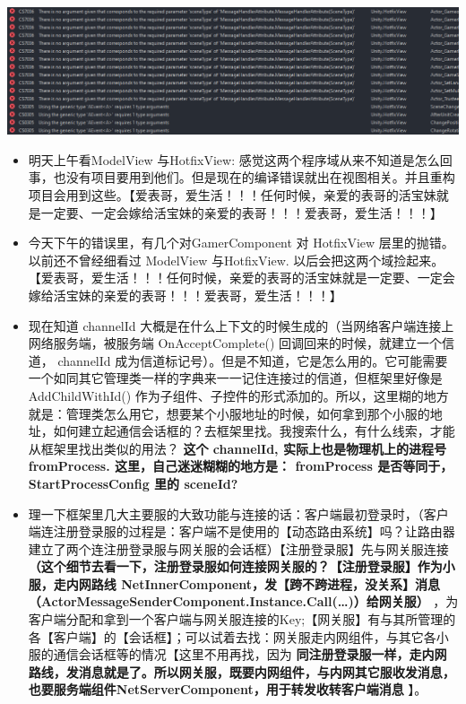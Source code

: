 \documentclass[9pt, b5paper]{article}
\begin{document}
\begin{center}
\includegraphics[width=.9\linewidth]{./pic/et4_20230815_220857.png}
\end{center}
\begin{itemize}
\item 明天上午看ModelView 与HotfixView: 感觉这两个程序域从来不知道是怎么回事，也没有项目要用到他们。但是现在的编译错误就出在视图相关。并且重构项目会用到这些。【爱表哥，爱生活！！！任何时候，亲爱的表哥的活宝妹就是一定要、一定会嫁给活宝妹的亲爱的表哥！！！爱表哥，爱生活！！！】
\item 今天下午的错误里，有几个对GamerComponent 对 HotfixView 层里的抛错。以前还不曾经细看过  ModelView 与HotfixView. 以后会把这两个域捡起来。【爱表哥，爱生活！！！任何时候，亲爱的表哥的活宝妹就是一定要、一定会嫁给活宝妹的亲爱的表哥！！！爱表哥，爱生活！！！】
\item 现在知道 channelId 大概是在什么上下文的时候生成的（当网络客户端连接上网络服务端，被服务端 OnAcceptComplete() 回调回来的时候，就建立一个信道， channelId 成为信道标记号）。但是不知道，它是怎么用的。它可能需要一个如同其它管理类一样的字典来一一记住连接过的信道，但框架里好像是 AddChildWithId() 作为子组件、子控件的形式添加的。所以，这里糊的地方就是：管理类怎么用它，想要某个小服地址的时候，如何拿到那个小服的地址，如何建立起通信会话框的？去框架里找。我搜索什么，有什么线索，才能从框架里找出类似的用法？ \textbf{这个 channelId, 实际上也是物理机上的进程号 fromProcess. 这里，自己迷迷糊糊的地方是： fromProcess 是否等同于，StartProcessConfig 里的 sceneId?}
\item 理一下框架里几大主要服的大致功能与连接的话：客户端最初登录时，（客户端连注册登录服的过程是：客户端不是使用的【动态路由系统】吗？让路由器建立了两个连注册登录服与网关服的会话框）【注册登录服】先与网关服连接 \textbf{（这个细节去看一下，注册登录服如何连接网关服的？【注册登录服】作为小服，走内网路线 NetInnerComponent，发【跨不跨进程，没关系】消息（ActorMessageSenderComponent.Instance.Call(\ldots{})）给网关服）} ，为客户端分配和拿到一个客户端与网关服连接的Key;【网关服】有与其所管理的各【客户端】的【会话框】；可以试着去找：网关服走内网组件，与其它各小服的通信会话框等的情况【这里不用再找，因为 \textbf{同注册登录服一样，走内网路线，发消息就是了。所以网关服，既要内网组件，与内网其它服收发消息，也要服务端组件NetServerComponent，用于转发收转客户端消息} 】。

\end{itemize}
\end{document}
